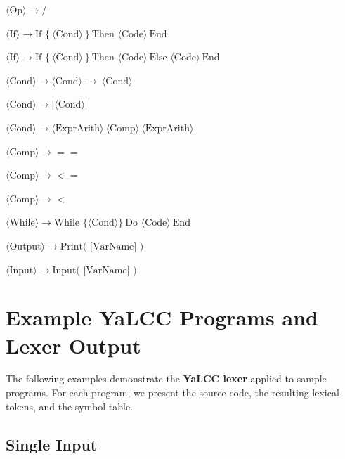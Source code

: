 \documentclass{article}
\begin{document}
\begin{enumerate}[label={[\,\arabic*\,]},leftmargin=*,itemsep=4pt]
  \item \(\langle\text{Op}\rangle \rightarrow /\)
  \item \(\langle\text{If}\rangle \rightarrow \text{If }\{\ \langle\text{Cond}\rangle\ \}\ \text{Then }\langle\text{Code}\rangle\ \text{End}\)
  \item \(\langle\text{If}\rangle \rightarrow \text{If }\{\ \langle\text{Cond}\rangle\ \}\ \text{Then }\langle\text{Code}\rangle\ \text{Else }\langle\text{Code}\rangle\ \text{End}\)
  \item \(\langle\text{Cond}\rangle \rightarrow \langle\text{Cond}\rangle\ \rightarrow\ \langle\text{Cond}\rangle\)  %
  \item \(\langle\text{Cond}\rangle \rightarrow \lvert\langle\text{Cond}\rangle\rvert\)
  \item \(\langle\text{Cond}\rangle \rightarrow \langle\text{ExprArith}\rangle\ \langle\text{Comp}\rangle\ \langle\text{ExprArith}\rangle\)
  \item \(\langle\text{Comp}\rangle \rightarrow ==\)
  \item \(\langle\text{Comp}\rangle \rightarrow <=\)
  \item \(\langle\text{Comp}\rangle \rightarrow <\)
  \item \(\langle\text{While}\rangle \rightarrow \text{While }\{\langle\text{Cond}\rangle\}\ \text{Do }\langle\text{Code}\rangle\ \text{End}\)
  \item \(\langle\text{Output}\rangle \rightarrow \text{Print( [VarName] )}\)
  \item \(\langle\text{Input}\rangle \rightarrow \text{Input( [VarName] )}\)
\end{enumerate}

\newpage

\section{Example YaLCC Programs and Lexer Output}
\label{appendix:example-ycc}

\noindent The following examples demonstrate the \textbf{YaLCC lexer} applied to sample programs. For each program, we present the source code, the resulting lexical tokens, and the symbol table.

\subsection{Single Input}
\end{document}

